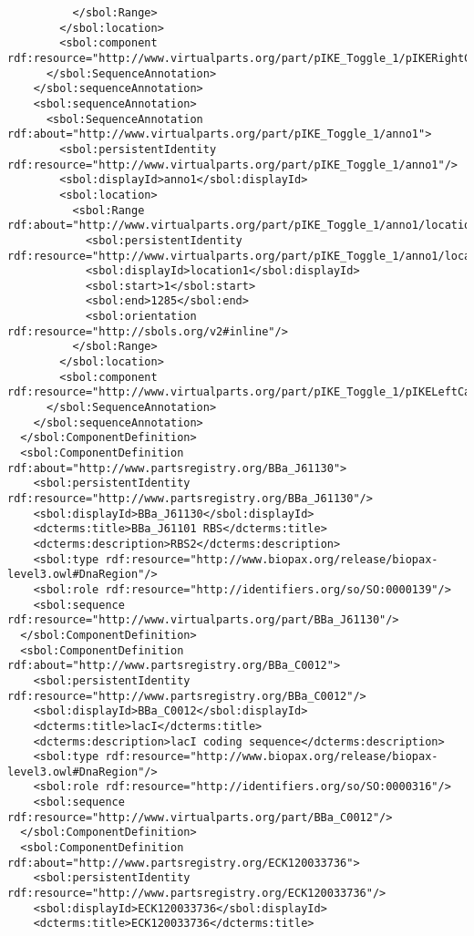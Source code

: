 \begin{lstlisting}
          </sbol:Range>
        </sbol:location>
        <sbol:component rdf:resource="http://www.virtualparts.org/part/pIKE_Toggle_1/pIKERightCassette_1"/>
      </sbol:SequenceAnnotation>
    </sbol:sequenceAnnotation>
    <sbol:sequenceAnnotation>
      <sbol:SequenceAnnotation rdf:about="http://www.virtualparts.org/part/pIKE_Toggle_1/anno1">
        <sbol:persistentIdentity rdf:resource="http://www.virtualparts.org/part/pIKE_Toggle_1/anno1"/>
        <sbol:displayId>anno1</sbol:displayId>
        <sbol:location>
          <sbol:Range rdf:about="http://www.virtualparts.org/part/pIKE_Toggle_1/anno1/location1">
            <sbol:persistentIdentity rdf:resource="http://www.virtualparts.org/part/pIKE_Toggle_1/anno1/location1"/>
            <sbol:displayId>location1</sbol:displayId>
            <sbol:start>1</sbol:start>
            <sbol:end>1285</sbol:end>
            <sbol:orientation rdf:resource="http://sbols.org/v2#inline"/>
          </sbol:Range>
        </sbol:location>
        <sbol:component rdf:resource="http://www.virtualparts.org/part/pIKE_Toggle_1/pIKELeftCassette_1"/>
      </sbol:SequenceAnnotation>
    </sbol:sequenceAnnotation>
  </sbol:ComponentDefinition>
  <sbol:ComponentDefinition rdf:about="http://www.partsregistry.org/BBa_J61130">
    <sbol:persistentIdentity rdf:resource="http://www.partsregistry.org/BBa_J61130"/>
    <sbol:displayId>BBa_J61130</sbol:displayId>
    <dcterms:title>BBa_J61101 RBS</dcterms:title>
    <dcterms:description>RBS2</dcterms:description>
    <sbol:type rdf:resource="http://www.biopax.org/release/biopax-level3.owl#DnaRegion"/>
    <sbol:role rdf:resource="http://identifiers.org/so/SO:0000139"/>
    <sbol:sequence rdf:resource="http://www.virtualparts.org/part/BBa_J61130"/>
  </sbol:ComponentDefinition>
  <sbol:ComponentDefinition rdf:about="http://www.partsregistry.org/BBa_C0012">
    <sbol:persistentIdentity rdf:resource="http://www.partsregistry.org/BBa_C0012"/>
    <sbol:displayId>BBa_C0012</sbol:displayId>
    <dcterms:title>lacI</dcterms:title>
    <dcterms:description>lacI coding sequence</dcterms:description>
    <sbol:type rdf:resource="http://www.biopax.org/release/biopax-level3.owl#DnaRegion"/>
    <sbol:role rdf:resource="http://identifiers.org/so/SO:0000316"/>
    <sbol:sequence rdf:resource="http://www.virtualparts.org/part/BBa_C0012"/>
  </sbol:ComponentDefinition>
  <sbol:ComponentDefinition rdf:about="http://www.partsregistry.org/ECK120033736">
    <sbol:persistentIdentity rdf:resource="http://www.partsregistry.org/ECK120033736"/>
    <sbol:displayId>ECK120033736</sbol:displayId>
    <dcterms:title>ECK120033736</dcterms:title>

\end{lstlisting}
